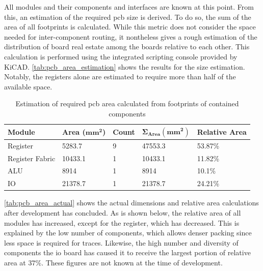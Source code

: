 All modules and their components and interfaces are known at this point. From this, an estimation of the required \ac{pcb} size is derived. To do so, the sum of the area of all footprints is calculated. While this metric does not consider the space needed for inter-component routing, it nontheless gives a rough estimation of the distribution of board real estate among the boards relative to each other. This calculation is performed using the integrated scripting console provided by KiCAD. \autoref{tab:pcb_area_estimation} shows the results for the size estimation. Notably, the registers alone are estimated to require more than half of the available space.

\begin{table}[H]
    \centering
        \begin{tabular}{|l|l|l|l|l|} 
            \hline
            \textbf{Module} & \textbf{Area ($\bm{mm^2}$)} & \textbf{Count} & $\bm{\Sigma_{Area} (mm^2)}$ & \textbf{Relative Area}  \\ 
            \hline
            Register        & 5283.7                          & 9                         & 47553.3         & 53.87\%                 \\ 
            \hline
            Register Fabric & 10433.1                         & 1                         & 10433.1         & 11.82\%                 \\ 
            \hline
            ALU             & 8914                            & 1                         & 8914            & 10.1\%                  \\ 
            \hline
            IO              & 21378.7                         & 1                         & 21378.7         & 24.21\%                 \\
            \hline
        \end{tabular}
        \caption[Estimated PCB area per module]{Estimation of required \ac{pcb} area calculated from footprints of contained components}
        \label{tab:pcb_area_estimation}
\end{table}

\autoref{tab:pcb_area_actual} shows the actual dimensions and relative area calculations after development has concluded. As is shown below, the relative area of all modules has increased, except for the register, which has decreased. This is explained by the low number of components, which allows denser packing since less space is required for traces. Likewise, the high number and diversity of components the \ac{io} board has caused it to receive the largest portion of relative area at $37\%$. These figures are not known at the time of development.

